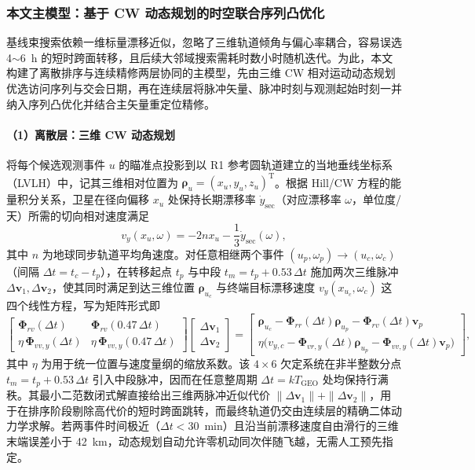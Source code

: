 \subsubsection{本文主模型：基于 CW 动态规划的时空联合序列凸优化}

基线束搜索依赖一维标量漂移近似，忽略了三维轨道倾角与偏心率耦合，容易误选 4$\sim$6~h 的短时跨面转移，且后续大邻域搜索需耗时数小时随机迭代。为此，本文构建了离散排序与连续精修两层协同的主模型，先由三维 CW 相对运动动态规划优选访问序列与交会日期，再在连续层将脉冲矢量、脉冲时刻与观测起始时刻一并纳入序列凸优化并结合主矢量重定位精修。

\paragraph{（1）离散层：三维 CW 动态规划}

将每个候选观测事件 $u$ 的瞄准点投影到以 R1 参考圆轨道建立的当地垂线坐标系（LVLH）中，记其三维相对位置为 $\bm\rho_u = (x_u, y_u, z_u)^{\mathrm T}$。根据 Hill/CW 方程的能量积分关系，卫星在径向偏移 $x_u$ 处保持长期漂移率 $\dot y_{\mathrm{sec}}$（对应漂移率 $\omega$，单位度/天）所需的切向相对速度满足\cite{cw1960}
\begin{equation}
  v_y(x_u, \omega) = -2n x_u - \frac{1}{3}\dot y_{\mathrm{sec}}(\omega) ,
  \label{eq:cwdrift}
\end{equation}
其中 $n$ 为地球同步轨道平均角速度。对任意相继两个事件 $(u_p, \omega_p) \to (u_c, \omega_c)$（间隔 $\Delta t = t_c - t_p$），在转移起点 $t_p$ 与中段 $t_m = t_p + 0.53\,\Delta t$ 施加两次三维脉冲 $\Delta\bm v_1, \Delta\bm v_2$，使其同时满足到达三维位置 $\bm\rho_{u_c}$ 与终端目标漂移速度 $v_y(x_{u_c}, \omega_c)$ 这四个线性方程，写为矩阵形式即
\begin{equation}
  \begin{bmatrix}
    \bm\Phi_{rv}(\Delta t) & \bm\Phi_{rv}(0.47\,\Delta t) \\
    \eta\,\bm\Phi_{vv,y}(\Delta t) & \eta\,\bm\Phi_{vv,y}(0.47\,\Delta t)
  \end{bmatrix}
  \begin{bmatrix} \Delta\bm v_1 \\ \Delta\bm v_2 \end{bmatrix}
  =
  \begin{bmatrix}
    \bm\rho_{u_c} - \bm\Phi_{rr}(\Delta t)\bm\rho_{u_p} - \bm\Phi_{rv}(\Delta t)\bm v_p \\
    \eta\big(v_{y,c} - \bm\Phi_{vr,y}(\Delta t)\bm\rho_{u_p} - \bm\Phi_{vv,y}(\Delta t)\bm v_p\big)
  \end{bmatrix} ,
  \label{eq:cw2burn}
\end{equation}
其中 $\eta$ 为用于统一位置与速度量纲的缩放系数。该 $4\times 6$ 欠定系统在非半整数分点 $t_m = t_p + 0.53\,\Delta t$ 引入中段脉冲，因而在任意整周期 $\Delta t = k T_{\mathrm{GEO}}$ 处均保持行满秩。其最小二范数闭式解直接给出三维两脉冲近似代价 $\|\Delta\bm v_1\| + \|\Delta\bm v_2\|$，用于在排序阶段剔除高代价的短时跨面跳转，而最终轨道仍交由连续层的精确二体动力学求解。若两事件时间极近（$\Delta t < 30$~min）且沿当前漂移速度自由滑行的三维末端误差小于 42~km，动态规划自动允许零机动同次伴随飞越，无需人工预先指定。

